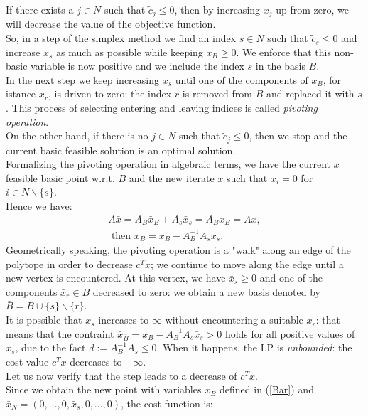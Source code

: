 \documentclass[a4paper,10 pt,titlepage,twoside]{report}
\theoremstyle{plain}
\theoremstyle{definition}
\theoremstyle{remark}
\begin{document}
 If there exists a $j \in N$ such that $\widetilde{c}_{j} \leq 0$, then by increasing $x_{j}$ up from zero, we will decrease the value of the objective function.\\
So, in a step of the simplex method we find an index $s \in N$ such that $\widetilde{c}_{s} \leq 0$ and increase $x_{s}$ as much as possible while keeping $x_{B} \geq 0$. We enforce that this non-basic variable is now positive and we include the index $s$ in the basis $B$.\\
In the next step we keep increasing $x_{s}$ until one of the components of $x_{B}$, for istance $x_{r}$, is driven to zero: the index $r$ is removed from $B$ and replaced it with $s$. This process of selecting entering and leaving indices is called \textit{pivoting operation}. \\
On the other hand, if there is no $j \in N$ such that $\widetilde{c}_{j} \leq 0$, then we stop and the current basic feasible solution is an optimal solution. \\
Formalizing the pivoting operation in algebraic terms, we have the current $x$ feasible basic point w.r.t. $B$ and the new iterate $\bar{x}$ such that $\bar{x}_{i} = 0$ for $i \in N\backslash\{s\}$.\\
Hence we have: 
\begin{align}
	A\bar{x} = A_{B}\bar{x}_{B} +A_{s}\bar{x}_{s} = A_{B}x_{B} = Ax,\\
	\text{  then }
	\bar{x}_{B} = x_{B} - A_{B}^{-1}A_{s}\bar{x}_{s}\label{Bar}.
\end{align}
Geometrically speaking, the pivoting operation is a "walk" along an edge of the polytope in order to decrease $c^{T}x$; we continue to move along the edge until a new vertex is encountered. At this vertex, we have $\bar{x}_{s}\geq0$ and one of the components $\bar{x}_{r}\in B$ decreased to zero: we obtain a new basis denoted by $\bar{B} = B \cup \{s\} \backslash \{r\}$.\\
It is possible that $x_{s}$ increases to $\infty$ without encountering a suitable $x_{r}$: that means that the contraint $\bar{x}_{\bar{B}} = x_{B} - A_{B}^{-1}A_{s}\bar{x}_{s}>0$ holds for all positive values of $\bar{x}_{s}$, due to the fact $d := A_{B}^{-1}A_{s}\leq0$. When it happens, the LP is \textit{unbounded}: the cost value $c^{T}x$ decreases to $-\infty$.\\[0.5cm]
Let us now verify that the step leads to a decrease of $c^{T}x$.\\
Since we obtain the new point with variables $\bar{x}_{B}$ defined in (\ref{Bar}) and $\bar{x}_{N}=(0,\dots, 0, \bar{x}_{s}, 0,\dots, 0)$, the cost function is:
\end{document}
